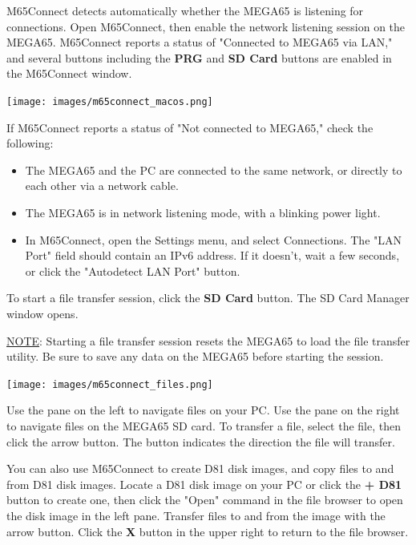 M65Connect detects automatically whether the MEGA65 is listening for connections. Open M65Connect, then enable the network listening session on the MEGA65. M65Connect reports a status of "Connected to MEGA65 via LAN," and several buttons including the {\bf PRG} and {\bf SD Card} buttons are enabled in the M65Connect window.

\begin{center}
\texttt{[image: images/m65connect\_macos.png]}
\end{center}

If M65Connect reports a status of "Not connected to MEGA65," check the following:

\begin{itemize}
\item The MEGA65 and the PC are connected to the same network, or directly to each other via a network cable.
\item The MEGA65 is in network listening mode, with a blinking power light.
\item In M65Connect, open the Settings menu, and select Connections. The "LAN Port" field should contain an IPv6 address. If it doesn't, wait a few seconds, or click the "Autodetect LAN Port" button.
\end{itemize}

To start a file transfer session, click the {\bf SD Card} button. The SD Card Manager window opens.

\underline{NOTE}: Starting a file transfer session resets the MEGA65 to load the file transfer utility. Be sure to save any data on the MEGA65 before starting the session.

\begin{center}
\texttt{[image: images/m65connect\_files.png]}
\end{center}

Use the pane on the left to navigate files on your PC. Use the pane on the right to navigate files on the MEGA65 SD card. To transfer a file, select the file, then click the arrow button. The button indicates the direction the file will transfer.

You can also use M65Connect to create D81 disk images, and copy files to and from D81 disk images. Locate a D81 disk image on your PC or click the {\bf + D81} button to create one, then click the "Open" command in the file browser to open the disk image in the left pane. Transfer files to and from the image with the arrow button. Click the {\bf X} button in the upper right to return to the file browser.

